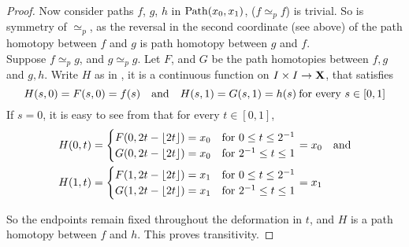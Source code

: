 \documentclass[../main-manifolds.tex]{subfiles}
\providecommand{\phtp}{\simeq_p} %
\begin{document}
\begin{proof}
    Now consider paths $f$, $g$, $h$ in $\Path[x_0,x_1]$, ($f\phtp f$) is trivial. So is symmetry of $\phtp$, as the reversal in the second coordinate (see above) of the path homotopy between $f$ and $g$ is path homotopy between $g$ and $f$.\\

    Suppose $f\phtp g$, and $g\phtp g$. Let $F$, and $G$ be the path homotopies between $f,g$ and $g,h$. Write $H$ as in , it is a continuous function on $I\times I\to {\mathbf{X}}$, that satisfies
    \[
        H(s,0) = F(s,0) = f(s)\qqtext{and} H(s,1)=G(s,1)=h(s)\: \text{for every }s\in[0,1]
    \]
    If $s=0$, it is easy to see from  that for every $t\in[0,1]$, 
    \begin{align*}
        H(0,t)&=\begin{cases}
            F(0,2t-\lfloor2t\rfloor)=x_0 & \text{for } 0\leq t\leq 2^{-1}\\
            G(0,2t-\lfloor2t\rfloor)=x_0 & \text{for } 2^{-1}\leq t\leq 1\\
        \end{cases}=x_0\quad \text{and}\\
        H(1,t)&=\begin{cases}
            F(1,2t-\lfloor2t\rfloor)=x_1 & \text{for } 0\leq t\leq 2^{-1}\\
            G(1,2t-\lfloor2t\rfloor)=x_1 & \text{for } 2^{-1}\leq t\leq 1\\
        \end{cases}=x_1
    \end{align*}

    So the endpoints remain fixed throughout the deformation in $t$, and $H$ is a path homotopy between $f$ and $h$. This proves transitivity.
\end{proof}

\end{document}
